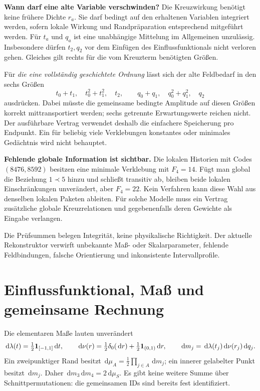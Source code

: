\documentclass[10pt,a4paper]{article}
\newcommand{\dd}{\,\mathrm d}\newcommand{\ii}{\mathrm i}
\begin{document}
\textbf{Wann darf eine alte Variable verschwinden?}
Die Kreuzwirkung benötigt keine frühere Dichte $r_a$. Sie darf bedingt auf
den erhaltenen Variablen integriert werden, sofern lokale Wirkung und
Randpräparation entsprechend mitgeführt werden. Für $t_a$ und $q_a$ ist
eine unabhängige Mittelung im Allgemeinen unzulässig. Insbesondere dürfen
$t_2,q_2$ vor dem Einfügen des Einflussfunktionals nicht verloren gehen.
Gleiches gilt rechts für die vom Kreuzterm benötigten Größen.

Für \emph{die eine vollständig geschichtete Ordnung} lässt sich der alte
Feldbedarf in den sechs Größen
\[
 t_0+t_1,\quad t_0^2+t_1^2,\quad t_2,\qquad
 q_0+q_1,\quad q_0^2+q_1^2,\quad q_2
\]
ausdrücken. Dabei müsste die gemeinsame bedingte Amplitude auf diesen Größen
korrekt mittransportiert werden; sechs getrennte Erwartungswerte reichen nicht.
Der ausführbare Vertrag verwendet deshalb die einfachere Speicherung pro
Endpunkt. Ein für beliebig viele Verklebungen konstantes oder minimales
Gedächtnis wird nicht behauptet.

\textbf{Fehlende globale Information ist sichtbar.}
Die lokalen Historien mit Codes $(8476,8592)$ besitzen eine minimale
Verklebung mit $F_4=14$. Fügt man global die Beziehung $1\prec5$ hinzu und
schließt transitiv ab, bleiben beide lokalen Einschränkungen unverändert,
aber $F_4=22$. Kein Verfahren kann diese Wahl aus denselben lokalen Paketen
ableiten. Für solche Modelle muss ein Vertrag zusätzliche globale
Kreuzrelationen und gegebenenfalls deren Gewichte als Eingabe verlangen.

Die Prüfsummen belegen Integrität, keine physikalische Richtigkeit.
Der aktuelle Rekonstruktor verwirft unbekannte Maß- oder Skalarparameter,
fehlende Feldbindungen, falsche Orientierung und inkonsistente Intervallprofile.
\newpage

\section{Einflussfunktional, Maß und gemeinsame Rechnung}
Die elementaren Maße lauten unverändert
\[
 \dd\lambda(t)=\tfrac12\one_{[-1,1]}\dd t,\qquad
 \dd\nu(r)=\tfrac12\delta_0(\dd r)+\tfrac12\one_{(0,1)}\dd r,
 \qquad \dd m_j=\dd\lambda(t_j)\dd\nu(r_j)\dd q_j.
\]
Ein zweipunktiger Rand besitzt
$\dd\mu_A=\tfrac12\prod_{j\in A}\dd m_j$;
ein innerer gelabelter Punkt besitzt $\dd m_j$.
Daher $\dd m_3\dd m_4=2\dd\mu_S$.
Es gibt keine weitere Summe über Schnittpermutationen:
die gemeinsamen IDs sind bereits fest identifiziert.
\end{document}
